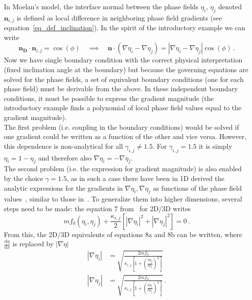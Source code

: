 	In Moelan's model, the interface normal between the phase fields $\eta_i,\,\eta_j$ denoted $\bm{n}_{i,j}$ is defined as local difference in neighboring phase field gradients (see equation~\ref{eq_def_inclination}). In the spirit of the introductory example we can write
	\begin{equation}
		\bm{n_D}\cdot\bm{n}_{i,j} = \cos(\phi) \quad \implies \quad \bm{n}\cdot(\nabla\eta_i-\nabla\eta_j) = |\nabla\eta_i-\nabla\eta_j|\cos(\phi) \,.
	\end{equation}
	Now we have single boundary condition with the correct physical interpretation (fixed inclination angle at the boundary) but because the governing equations are solved for the phase fields, a set of equivalent boundary conditions (one for each phase field) must be derivable from the above. In these independent boundary conditions, it must be possible to express the gradient magnitude (the introductory example finds a polynomial of local phase field values equal to the gradient magnitude). \\
	The first problem (i.e. coupling in the boundary conditions) would be solved if one gradient could be written as a function of the other and vice versa. However, this dependence is non-analytical for all $\gamma_{i,j}\neq1.5$. For $\gamma_{i,j}=1.5$ it is simply $\eta_i = 1-\eta_j$ and therefore also $\nabla\eta_i=-\nabla\eta_j$.~\cite{Moelans2008} \\
	The second problem (i.e. the expression for gradient magnitude) is also enabled by the choice $\gamma=1.5$, as in such a case there have been in 1D derived the analytic expressions for the gradients in $\nabla\eta_i,\nabla\eta_j$ as functions of the phase field values~\cite{Moelans2008}, similar to those in~\cite{Granasy2007}. To generalize them into higher dimensions, several steps need to be made: 
%	
	the equation 7 from~\cite{Moelans2008} for 2D/3D writes
	\begin{equation}
		mf_0(\eta_i, \eta_j) + \frac{\kappa_{i,j}}{2} \left[ |\nabla \eta_i|^2 + |\nabla \eta_j|^2 \right] = 0 \,.
	\end{equation}
	From this, the 2D/3D equivalents of equations 8a and 8b can be written, where $\frac{\mathrm{d}\eta}{\mathrm{d}x}$ is replaced by $|\nabla\eta|$
	\begin{equation}\label{eq_PFgradient_analytic_2}
		\begin{split}
			|\nabla\eta_{i}| &= \sqrt{\frac{2mf_0}{\kappa_{i,j}\left[1 + \left( \frac{\mathrm{d} \eta_j}{\mathrm{d} \eta_i} \right)^2\right]}} \\
			|\nabla\eta_{j}| &= \sqrt{\frac{2mf_0}{\kappa_{i,j}\left[1 + \left( \frac{\mathrm{d} \eta_i}{\mathrm{d} \eta_j} \right)^2\right]}} \,.
		\end{split}
	\end{equation}
